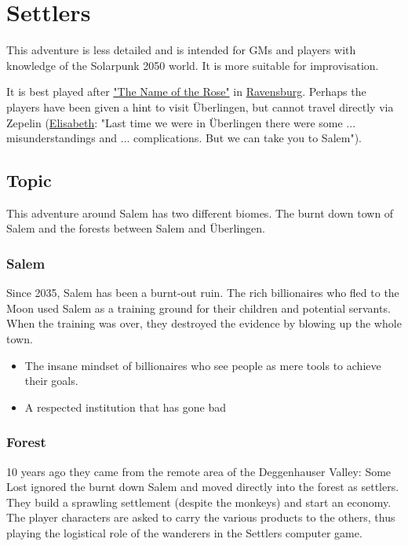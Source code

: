 \chapter{Settlers}
\label{ch:settlers}

This adventure is less detailed and is intended for GMs and players with knowledge of the Solarpunk 2050 world. It is more suitable for improvisation.

It is best played after \hyperref[ch:the name of the rose]{"The Name of the Rose"} in \hyperref[subsec:Ravensburg]{Ravensburg}. Perhaps the players have been given a hint to visit Überlingen, but cannot travel directly via Zepelin (\hyperref[sec:Jaime and Elisabeth]{Elisabeth}: "Last time we were in Überlingen there were some ... misunderstandings and ... complications. But we can take you to Salem").

\section{Topic}

This adventure around Salem has two different biomes. The burnt down town of Salem and the forests between Salem and Überlingen.
\subsection{Salem}

Since 2035, Salem has been a burnt-out ruin.
The rich billionaires who fled to the Moon used Salem as a training ground for their children and potential servants. When the training was over, they destroyed the evidence by blowing up the whole town.

\begin{itemize}
    \item The insane mindset of billionaires who see people as mere tools to achieve their goals.
    \item A respected institution that has gone bad
\end{itemize}

\subsection{Forest}

10 years ago they came from the remote area of the Deggenhauser Valley: Some Lost ignored the burnt down Salem and moved directly into the forest as settlers. They build a sprawling settlement (despite the monkeys) and start an economy. The player characters are asked to carry the various products to the others, thus playing the logistical role of the wanderers in the Settlers computer game.

